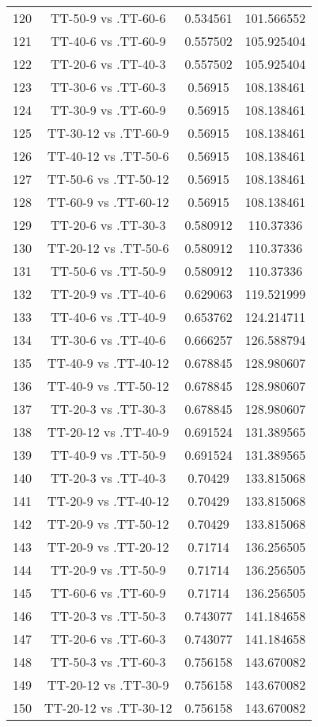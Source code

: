 \documentclass[a4paper,10pt]{article}
\begin{document}
\begin{landscape}
\begin{table}[!htp]
\begin{tabular}{cccc}
120&TT-50-9 vs .TT-60-6&0.534561&101.566552\\
121&TT-40-6 vs .TT-60-9&0.557502&105.925404\\
122&TT-20-6 vs .TT-40-3&0.557502&105.925404\\
123&TT-30-6 vs .TT-60-3&0.56915&108.138461\\
124&TT-30-9 vs .TT-60-9&0.56915&108.138461\\
125&TT-30-12 vs .TT-60-9&0.56915&108.138461\\
126&TT-40-12 vs .TT-50-6&0.56915&108.138461\\
127&TT-50-6 vs .TT-50-12&0.56915&108.138461\\
128&TT-60-9 vs .TT-60-12&0.56915&108.138461\\
129&TT-20-6 vs .TT-30-3&0.580912&110.37336\\
130&TT-20-12 vs .TT-50-6&0.580912&110.37336\\
131&TT-50-6 vs .TT-50-9&0.580912&110.37336\\
132&TT-20-9 vs .TT-40-6&0.629063&119.521999\\
133&TT-40-6 vs .TT-40-9&0.653762&124.214711\\
134&TT-30-6 vs .TT-40-6&0.666257&126.588794\\
135&TT-40-9 vs .TT-40-12&0.678845&128.980607\\
136&TT-40-9 vs .TT-50-12&0.678845&128.980607\\
137&TT-20-3 vs .TT-30-3&0.678845&128.980607\\
138&TT-20-12 vs .TT-40-9&0.691524&131.389565\\
139&TT-40-9 vs .TT-50-9&0.691524&131.389565\\
140&TT-20-3 vs .TT-40-3&0.70429&133.815068\\
141&TT-20-9 vs .TT-40-12&0.70429&133.815068\\
142&TT-20-9 vs .TT-50-12&0.70429&133.815068\\
143&TT-20-9 vs .TT-20-12&0.71714&136.256505\\
144&TT-20-9 vs .TT-50-9&0.71714&136.256505\\
145&TT-60-6 vs .TT-60-9&0.71714&136.256505\\
146&TT-20-3 vs .TT-50-3&0.743077&141.184658\\
147&TT-20-6 vs .TT-60-3&0.743077&141.184658\\
148&TT-50-3 vs .TT-60-3&0.756158&143.670082\\
149&TT-20-12 vs .TT-30-9&0.756158&143.670082\\
150&TT-20-12 vs .TT-30-12&0.756158&143.670082\\

\end{tabular}
\end{table}
\end{landscape}
\end{document}
